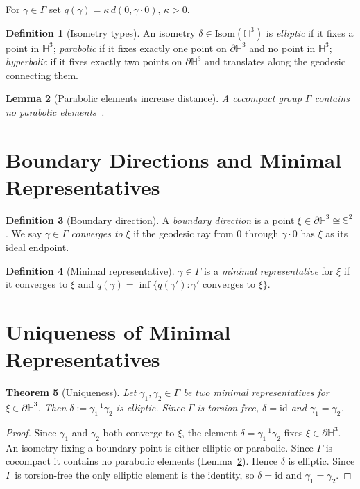 ﻿\documentclass[12pt]{article}
\newtheorem{theorem}{Theorem}[section]
\newtheorem{lemma}[theorem]{Lemma}
\theoremstyle{definition}
\newtheorem{definition}[theorem]{Definition}
\theoremstyle{remark}
\newcommand{\Hthree}{\mathbb{H}^3}
\newcommand{\GammaG}{\Gamma}
\newcommand{\bdry}{\partial\mathbb{H}^3}
\begin{document}
For $\gamma\in\GammaG$ set $q(\gamma)=\kappa\,d(0,\gamma\cdot0)$, $\kappa>0$.

\begin{definition}[Isometry types]\label{def:types}
An isometry $\delta\in\mathrm{Isom}(\Hthree)$ is \emph{elliptic} if it
fixes a point in $\Hthree$; \emph{parabolic} if it fixes exactly one point
on $\bdry$ and no point in $\Hthree$; \emph{hyperbolic} if it fixes exactly
two points on $\bdry$ and translates along the geodesic connecting them.
\end{definition}

\begin{lemma}[Parabolic elements increase distance]\label{lem:parabolic}
A cocompact group $\GammaG$ contains no parabolic elements~\cite{ratcliffe}.
\end{lemma}

\section{Boundary Directions and Minimal Representatives}

\begin{definition}[Boundary direction]\label{def:bdrydir}
A \emph{boundary direction} is a point $\xi\in\bdry\cong\mathbb{S}^2$.
We say $\gamma\in\GammaG$ \emph{converges to} $\xi$ if the geodesic ray
from $0$ through $\gamma\cdot0$ has $\xi$ as its ideal endpoint.
\end{definition}

\begin{definition}[Minimal representative]\label{def:minimal}
$\gamma\in\GammaG$ is a \emph{minimal representative} for $\xi$ if it
converges to $\xi$ and $q(\gamma)=\inf\{q(\gamma'):\gamma'\text{ converges to }\xi\}$.
\end{definition}

\section{Uniqueness of Minimal Representatives}

\begin{theorem}[Uniqueness]\label{thm:uniqueness}
Let $\gamma_1,\gamma_2\in\GammaG$ be two minimal representatives for
$\xi\in\bdry$. Then $\delta:=\gamma_1^{-1}\gamma_2$ is elliptic. Since
$\GammaG$ is torsion-free, $\delta=\mathrm{id}$ and $\gamma_1=\gamma_2$.
\end{theorem}

\begin{proof}
Since $\gamma_1$ and $\gamma_2$ both converge to $\xi$, the element
$\delta=\gamma_1^{-1}\gamma_2$ fixes $\xi\in\bdry$. An isometry fixing a
boundary point is either elliptic or parabolic. Since $\GammaG$ is cocompact
it contains no parabolic elements (Lemma~\ref{lem:parabolic}). Hence $\delta$
is elliptic. Since $\GammaG$ is torsion-free the only elliptic element is
the identity, so $\delta=\mathrm{id}$ and $\gamma_1=\gamma_2$.
\end{proof}
\end{document}
